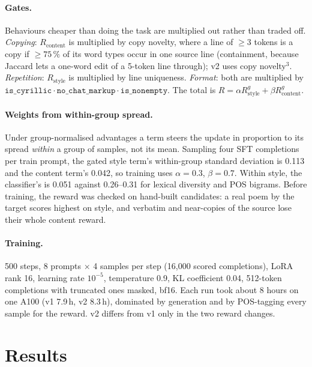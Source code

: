 \documentclass[11pt]{article}
\begin{document}
\paragraph{Gates.} Behaviours cheaper than doing the task are multiplied out
rather than traded off. \emph{Copying}: $R_{\mathrm{content}}$ is multiplied
by copy novelty, where a line of $\ge3$ tokens is a copy if $\ge75\,\%$ of its
word types occur in one source line (containment, because Jaccard lets a
one-word edit of a 5-token line through); v2 uses copy novelty$^3$.
\emph{Repetition}: $R_{\mathrm{style}}$ is multiplied by line uniqueness.
\emph{Format}: both are multiplied by
$\texttt{is\_cyrillic}\cdot\texttt{no\_chat\_markup}\cdot\texttt{is\_nonempty}$.
The total is $R=\alpha R^{g}_{\mathrm{style}}+\beta R^{g}_{\mathrm{content}}$.

\paragraph{Weights from within-group spread.} Under group-normalised
advantages a term steers the update in proportion to its spread \emph{within}
a group of samples, not its mean. Sampling four SFT completions per train
prompt, the gated style term's within-group standard deviation is 0.113 and
the content term's 0.042, so training uses $\alpha=0.3$, $\beta=0.7$. Within
style, the classifier's is 0.051 against 0.26--0.31 for lexical diversity and
POS bigrams. Before training, the reward was checked on hand-built candidates:
a real poem by the target scores highest on style, and verbatim and
near-copies of the source lose their whole content reward.

\paragraph{Training.} 500 steps, 8 prompts $\times$ 4 samples per step
(16{,}000 scored completions), LoRA rank 16, learning rate $10^{-5}$,
temperature 0.9, KL coefficient 0.04, 512-token completions with truncated
ones masked, bf16. Each run took about 8 hours on one A100 (v1 7.9\,h, v2
8.3\,h), dominated by generation and by POS-tagging every sample for the
reward. v2 differs from v1 only in the two reward changes.

\section{Results}\label{sec:results}
\end{document}
